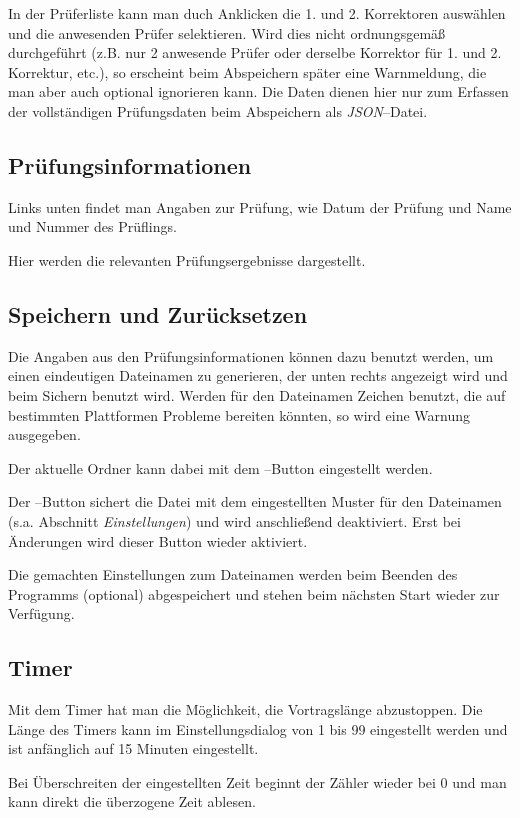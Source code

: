 \documentclass[a4paper,notitlepage,parskip=half]{scrartcl}
\begin{document}
In der Prüferliste kann man duch Anklicken die 1. und 2. Korrektoren auswählen und die anwesenden Prüfer selektieren. Wird dies nicht ordnungsgemäß durchgeführt (z.B. nur 2 anwesende Prüfer oder derselbe Korrektor für 1. und 2. Korrektur, etc.), so erscheint beim Abspeichern später eine Warnmeldung, die man aber auch optional ignorieren kann. Die Daten dienen hier nur zum Erfassen der vollständigen Prüfungsdaten beim Abspeichern als \emph{JSON}--Datei.

\subsection{Prüfungsinformationen}
Links unten findet man Angaben zur Prüfung, wie Datum der Prüfung und Name und Nummer des Prüflings.

Hier werden die relevanten Prüfungsergebnisse dargestellt.

\subsection{Speichern und Zurücksetzen}
Die Angaben aus den Prüfungsinformationen können dazu benutzt werden, um einen eindeutigen Dateinamen zu generieren, der unten rechts angezeigt wird und beim Sichern benutzt wird. Werden für den Dateinamen Zeichen benutzt, die auf bestimmten Plattformen Probleme bereiten könnten, so wird eine Warnung ausgegeben. 

Der aktuelle Ordner kann dabei mit dem --Button eingestellt werden.

Der --Button sichert die Datei mit dem eingestellten Muster für den Dateinamen (s.a. Abschnitt \emph{Einstellungen}) und wird anschließend deaktiviert. Erst bei Änderungen wird dieser Button wieder aktiviert.

Die gemachten Einstellungen zum Dateinamen werden beim Beenden des Programms (optional) abgespeichert und stehen beim nächsten Start wieder zur Verfügung.

\subsection{Timer}
Mit dem Timer hat man die Möglichkeit, die Vortragslänge abzustoppen.
Die Länge des Timers kann im Einstellungsdialog von 1 bis 99 eingestellt werden und ist anfänglich auf 15 Minuten eingestellt.

Bei Überschreiten der eingestellten Zeit beginnt der Zähler wieder bei 0 und man kann direkt die überzogene Zeit ablesen.
\end{document}
